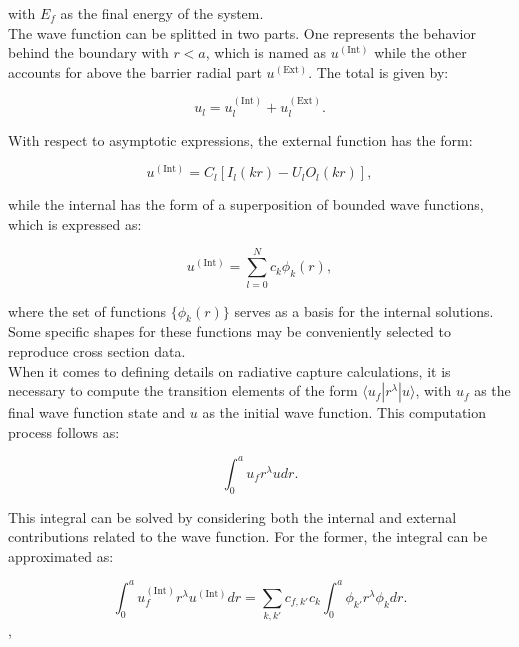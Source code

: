 \documentclass[openany]{book}
\begin{document}
with $E_f$ as the final energy of the system. \\


The wave function can be splitted in two parts. One represents the behavior behind the boundary with $r < a$, which is named as $u^{(\mathrm{Int})}$ while the other accounts for above the barrier radial part $u^{(\mathrm{Ext})}$. The total is given by: 

\begin{equation}\label{rmatrix_internal_external}
	u_l = u^{(\mathrm{Int})}_l +  u^{(\mathrm{Ext})}_l.
\end{equation} 

With respect to asymptotic expressions, the external function has the form: 

\begin{equation}\label{rmatrix_external_asymptotic}
	u^{(\mathrm{Int})} = C_l [I_l(kr) - U_l O_l(kr)],
\end{equation} 

while the internal has the form of a superposition of bounded wave functions, which is expressed as: 

\begin{equation}\label{rmatrix_internal_asymptotic}
	u^{(\mathrm{Int})} = \sum_{l=0}^{N} c_k \phi_k(r),
\end{equation} 

where the set of functions $\{\phi_k(r)\}$ serves as a basis for the internal solutions. Some specific shapes for these functions may be conveniently selected to reproduce cross section data. \\

When it comes to defining details on radiative capture calculations, it is necessary to compute the transition elements of the form $\langle u_f | r^\lambda| u \rangle $, with $u_f$ as the final wave function state and $u$ as the initial wave function. This computation process follows as:
 
\begin{equation}\label{rmatrix_radiativeCapture_integral}
	\int_0^{a} u_f r^\lambda u  dr.
\end{equation}

This integral can be solved by considering both the internal and external contributions related to the wave function. For the former, the integral can be approximated as: 

\begin{equation}\label{rmatrix_radiativeCapture_integral_internal}
	\int_0^{a} u^{(\mathrm{Int})}_f r^\lambda u^{(\mathrm{Int})}  dr  = \sum_{k, k'} c_{f, k'} c_{k} \int_0^{a} \phi_{k'} r^\lambda \phi_{k}dr. 
\end{equation},
\end{document}
